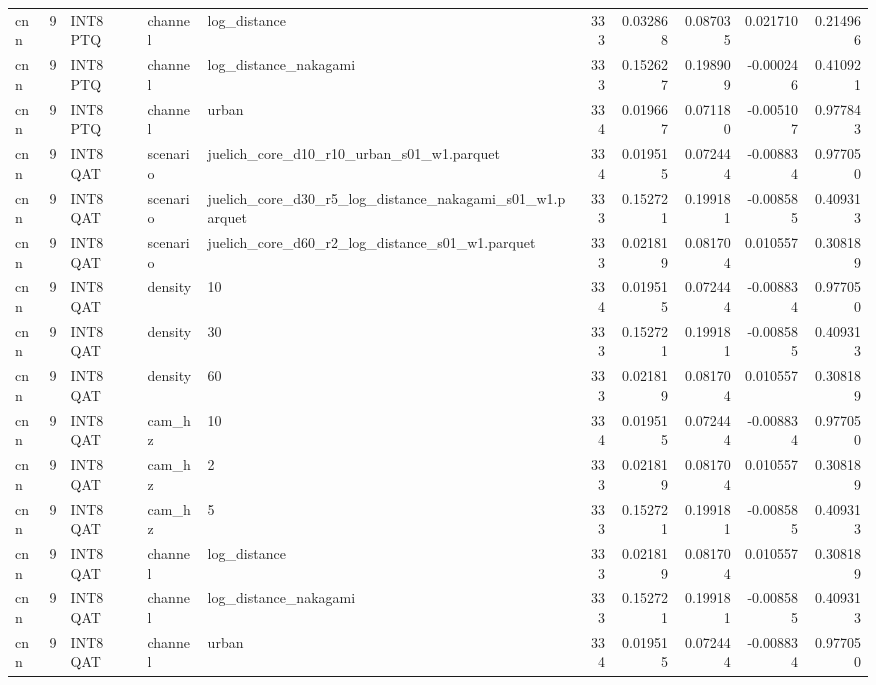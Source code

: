 \begin{tabular}{lrlllrrrrr}
cnn & 9 & INT8 PTQ & channel & log\_distance & 333 & 0.032868 & 0.087035 & 0.021710 & 0.214966 \\
cnn & 9 & INT8 PTQ & channel & log\_distance\_nakagami & 333 & 0.152627 & 0.198909 & -0.000246 & 0.410921 \\
cnn & 9 & INT8 PTQ & channel & urban & 334 & 0.019667 & 0.071180 & -0.005107 & 0.977843 \\
cnn & 9 & INT8 QAT & scenario & juelich\_core\_d10\_r10\_urban\_s01\_w1.parquet & 334 & 0.019515 & 0.072444 & -0.008834 & 0.977050 \\
cnn & 9 & INT8 QAT & scenario & juelich\_core\_d30\_r5\_log\_distance\_nakagami\_s01\_w1.parquet & 333 & 0.152721 & 0.199181 & -0.008585 & 0.409313 \\
cnn & 9 & INT8 QAT & scenario & juelich\_core\_d60\_r2\_log\_distance\_s01\_w1.parquet & 333 & 0.021819 & 0.081704 & 0.010557 & 0.308189 \\
cnn & 9 & INT8 QAT & density & 10 & 334 & 0.019515 & 0.072444 & -0.008834 & 0.977050 \\
cnn & 9 & INT8 QAT & density & 30 & 333 & 0.152721 & 0.199181 & -0.008585 & 0.409313 \\
cnn & 9 & INT8 QAT & density & 60 & 333 & 0.021819 & 0.081704 & 0.010557 & 0.308189 \\
cnn & 9 & INT8 QAT & cam\_hz & 10 & 334 & 0.019515 & 0.072444 & -0.008834 & 0.977050 \\
cnn & 9 & INT8 QAT & cam\_hz & 2 & 333 & 0.021819 & 0.081704 & 0.010557 & 0.308189 \\
cnn & 9 & INT8 QAT & cam\_hz & 5 & 333 & 0.152721 & 0.199181 & -0.008585 & 0.409313 \\
cnn & 9 & INT8 QAT & channel & log\_distance & 333 & 0.021819 & 0.081704 & 0.010557 & 0.308189 \\
cnn & 9 & INT8 QAT & channel & log\_distance\_nakagami & 333 & 0.152721 & 0.199181 & -0.008585 & 0.409313 \\
cnn & 9 & INT8 QAT & channel & urban & 334 & 0.019515 & 0.072444 & -0.008834 & 0.977050 \\
\bottomrule
\end{tabular}
